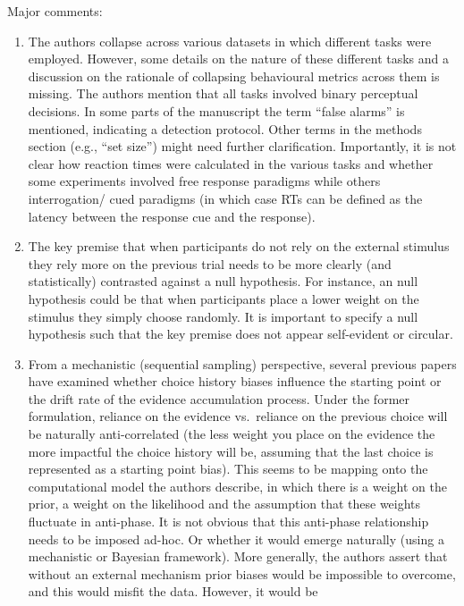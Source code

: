 \documentclass[
]{article}
\begin{document}
Major comments:

\begin{enumerate}
\def\labelenumi{\arabic{enumi})}
\item
  The authors collapse across various datasets in which different tasks
  were employed. However, some details on the nature of these different
  tasks and a discussion on the rationale of collapsing behavioural
  metrics across them is missing. The authors mention that all tasks
  involved binary perceptual decisions. In some parts of the manuscript
  the term ``false alarms'' is mentioned, indicating a detection
  protocol. Other terms in the methods section (e.g., ``set size'')
  might need further clarification. Importantly, it is not clear how
  reaction times were calculated in the various tasks and whether some
  experiments involved free response paradigms while others
  interrogation/ cued paradigms (in which case RTs can be defined as the
  latency between the response cue and the response).
\item
  The key premise that when participants do not rely on the external
  stimulus they rely more on the previous trial needs to be more clearly
  (and statistically) contrasted against a null hypothesis. For
  instance, an null hypothesis could be that when participants place a
  lower weight on the stimulus they simply choose randomly. It is
  important to specify a null hypothesis such that the key premise does
  not appear self-evident or circular.
\item
  From a mechanistic (sequential sampling) perspective, several previous
  papers have examined whether choice history biases influence the
  starting point or the drift rate of the evidence accumulation process.
  Under the former formulation, reliance on the evidence vs.~reliance on
  the previous choice will be naturally anti-correlated (the less weight
  you place on the evidence the more impactful the choice history will
  be, assuming that the last choice is represented as a starting point
  bias). This seems to be mapping onto the computational model the
  authors describe, in which there is a weight on the prior, a weight on
  the likelihood and the assumption that these weights fluctuate in
  anti-phase. It is not obvious that this anti-phase relationship needs
  to be imposed ad-hoc. Or whether it would emerge naturally (using a
  mechanistic or Bayesian framework). More generally, the authors assert
  that without an external mechanism prior biases would be impossible to
  overcome, and this would misfit the data. However, it would be

\end{enumerate}
\end{document}
